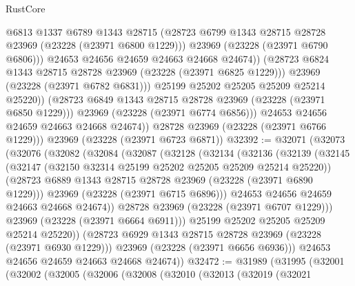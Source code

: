 \begin{lexlean}{RustCore}
\begin{coremodule}
                        @6813
                        @1337
                        @6789
                        @1343
                        @28715
                        (@28723 @6799 @1343 @28715 @28728 @23969 (@23228 (@23971 @6800 @1229)))
                        @23969
                        (@23228 (@23971 @6790 @6806)))
                      @24653
                      @24656
                      @24659
                      @24663
                      @24668
                      @24674))
                  (@28723 @6824 @1343 @28715 @28728 @23969 (@23228 (@23971 @6825 @1229)))
                  @23969
                  (@23228 (@23971 @6782 @6831)))
                @25199
                @25202
                @25205
                @25209
                @25214
                @25220))
            (@28723 @6849 @1343 @28715 @28728 @23969 (@23228 (@23971 @6850 @1229)))
            @23969
            (@23228 (@23971 @6774 @6856)))
          @24653
          @24656
          @24659
          @24663
          @24668
          @24674))
      @28728
      @23969
      (@23228 (@23971 @6766 @1229)))
    @23969
    (@23228 (@23971 @6723 @6871))
@32392 := @32071
    (@32073
      (@32076
        (@32082
          (@32084
            (@32087
              (@32128
                (@32134
                  (@32136
                    (@32139
                      (@32145
                        (@32147 (@32150 @32314 @25199 @25202 @25205 @25209 @25214 @25220))
                        (@28723 @6889 @1343 @28715 @28728 @23969 (@23228 (@23971 @6890 @1229)))
                        @23969
                        (@23228 (@23971 @6715 @6896)))
                      @24653
                      @24656
                      @24659
                      @24663
                      @24668
                      @24674))
                  @28728
                  @23969
                  (@23228 (@23971 @6707 @1229)))
                @23969
                (@23228 (@23971 @6664 @6911)))
              @25199
              @25202
              @25205
              @25209
              @25214
              @25220))
          (@28723 @6929 @1343 @28715 @28728 @23969 (@23228 (@23971 @6930 @1229)))
          @23969
          (@23228 (@23971 @6656 @6936)))
        @24653
        @24656
        @24659
        @24663
        @24668
        @24674))
@32472 := @31989
    (@31995
      (@32001
        (@32002
          (@32005
            (@32006
              (@32008
                (@32010
                  (@32013
                    (@32019
                      (@32021

\end{coremodule}
\end{lexlean}
